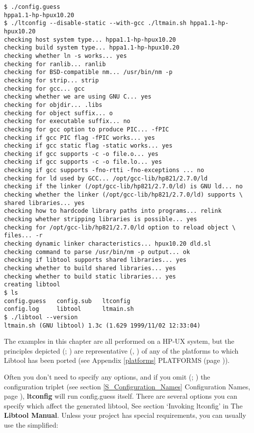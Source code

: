 \begin{verbatim}
$ ./config.guess
hppa1.1-hp-hpux10.20
$ ./ltconfig --disable-static --with-gcc ./ltmain.sh hppa1.1-hp-hpux10.20
checking host system type... hppa1.1-hp-hpux10.20
checking build system type... hppa1.1-hp-hpux10.20
checking whether ln -s works... yes
checking for ranlib... ranlib
checking for BSD-compatible nm... /usr/bin/nm -p
checking for strip... strip
checking for gcc... gcc
checking whether we are using GNU C... yes
checking for objdir... .libs
checking for object suffix... o
checking for executable suffix... no
checking for gcc option to produce PIC... -fPIC
checking if gcc PIC flag -fPIC works... yes
checking if gcc static flag -static works... yes
checking if gcc supports -c -o file.o... yes
checking if gcc supports -c -o file.lo... yes
checking if gcc supports -fno-rtti -fno-exceptions ... no
checking for ld used by GCC... /opt/gcc-lib/hp821/2.7.0/ld
checking if the linker (/opt/gcc-lib/hp821/2.7.0/ld) is GNU ld... no
checking whether the linker (/opt/gcc-lib/hp821/2.7.0/ld) supports \
shared libraries... yes
checking how to hardcode library paths into programs... relink
checking whether stripping libraries is possible... yes
checking for /opt/gcc-lib/hp821/2.7.0/ld option to reload object \
files... -r
checking dynamic linker characteristics... hpux10.20 dld.sl
checking command to parse /usr/bin/nm -p output... ok
checking if libtool supports shared libraries... yes
checking whether to build shared libraries... yes
checking whether to build static libraries... yes
creating libtool
$ ls
config.guess   config.sub   ltconfig
config.log     libtool      ltmain.sh
$ ./libtool --version
ltmain.sh (GNU libtool) 1.3c (1.629 1999/11/02 12:33:04)
\end{verbatim}

The examples in this chapter are all performed on a HP-UX system, but the 
principles depicted ({\MfQ{}}; {\MoQ{}}) are representative ({\MaQ{}}, {\MdQ{}}) of any 
of the platforms to which Libtool has been ported
(see Appendix \ref{platforms} PLATFORMS (page \pageref{platforms})). 


Often you don't need to specify any options, and if you omit ({\McQ{}}; {\MbQ{}}) the 
configuration triplet (see section \ref{S_Configuration_Names} Configuration
Names, page \pageref{S_Configuration_Names}), \textbf{ltconfig} will run 
config.guess itself. There are several options you can specify which 
affect the generated libtool, See section `Invoking ltconfig' in 
The \textbf{Libtool Manual}. Unless your project has special requirements,
you can usually use the simplified: 

